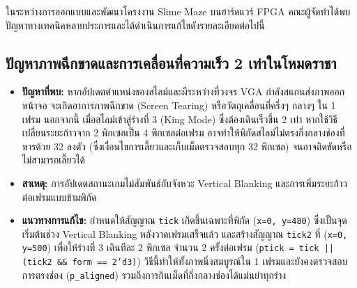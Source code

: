 
ในระหว่างการออกแบบและพัฒนาโครงงาน Slime Maze บนฮาร์ดแวร์ FPGA คณะผู้จัดทำได้พบปัญหาทางเทคนิคหลายประการและได้ดำเนินการแก้ไขดังรายละเอียดต่อไปนี้

\subsection{ปัญหาภาพฉีกขาดและการเคลื่อนที่ความเร็ว 2 เท่าในโหมดราชา}
\begin{itemize}[leftmargin=1.5cm]
    \item \textbf{ปัญหาที่พบ:} หากอัปเดตตำแหน่งของสไลม์และผีระหว่างที่วงจร VGA กำลังสแกนส่งภาพออกหน้าจอ จะเกิดอาการภาพฉีกขาด (Screen Tearing) หรือวัตถุเคลื่อนที่ครึ่งๆ กลางๆ ใน 1 เฟรม นอกจากนี้ เมื่อสไลม์เข้าสู่ร่างที่ 3 (King Mode) ซึ่งต้องเดินเร็วขึ้น 2 เท่า หากใช้วิธีเปลี่ยนระยะก้าวจาก 2 พิกเซลเป็น 4 พิกเซลต่อเฟรม อาจทำให้พิกัดสไลม์ไม่ตรงกึ่งกลางช่องที่หารด้วย 32 ลงตัว (ซึ่งเงื่อนไขการเลี้ยวและเก็บเม็ดตรวจสอบทุก 32 พิกเซล) จนอาจติดขัดหรือไม่สามารถเลี้ยวได้
    \item \textbf{สาเหตุ:} การอัปเดตสถานะเกมไม่สัมพันธ์กับจังหวะ Vertical Blanking และการเพิ่มระยะก้าวต่อเฟรมแบบข้ามพิกัด
    \item \textbf{แนวทางการแก้ไข:} กำหนดให้สัญญาณ \texttt{tick} เกิดขึ้นเฉพาะที่พิกัด (\texttt{x=0, y=480}) ซึ่งเป็นจุดเริ่มต้นช่วง Vertical Blanking หลังวาดเฟรมเสร็จแล้ว และสร้างสัญญาณ \texttt{tick2} ที่ (\texttt{x=0, y=500}) เพื่อให้ร่างที่ 3 เดินทีละ 2 พิกเซล จำนวน 2 ครั้งต่อเฟรม (\texttt{ptick = tick || (tick2 \&\& form == 2'd3)}) วิธีนี้ทำให้ทั้งภาพนิ่งสมบูรณ์ใน 1 เฟรมและยังคงตรวจสอบการตรงช่อง (\texttt{p\_aligned}) รวมถึงการกินเม็ดที่กึ่งกลางช่องได้แม่นยำทุกร่าง
\end{itemize}

